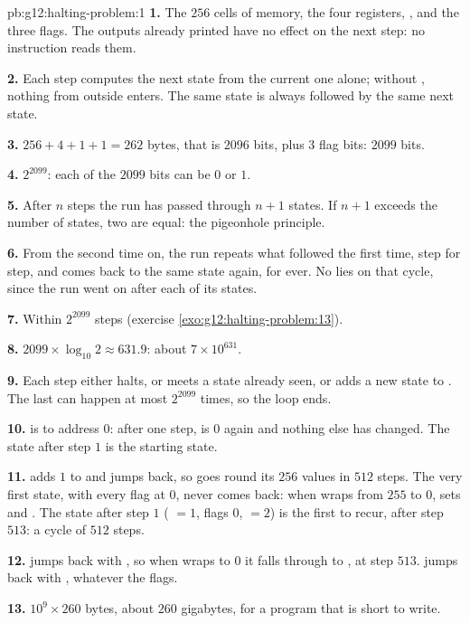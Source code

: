 \begin{solution}{pb:g12:halting-problem:1}
\textbf{1.} The $256$ cells of memory, the four registers, ,  and the three flags. The outputs
already printed have no effect on the next step: no instruction reads them.

\textbf{2.} Each step computes the next state from the current one alone; without , nothing from outside
enters. The same state is always followed by the same next state.

\textbf{3.} $256 + 4 + 1 + 1 = 262$ bytes, that is $2096$ bits, plus $3$ flag bits: $2099$ bits.

\textbf{4.} $2^{2099}$: each of the $2099$ bits can be $0$ or $1$.

\textbf{5.} After $n$ steps the run has passed through $n + 1$ states. If $n + 1$ exceeds the number of states, two
are equal: the pigeonhole principle.

\textbf{6.} From the second time on, the run repeats what followed the first time, step for step, and comes back to
the same state again, for ever. No  lies on that cycle, since the run went on after each of its states.

\textbf{7.} Within $2^{2099}$ steps (exercise \ref{exo:g12:halting-problem:13}).

\textbf{8.} $2099 \times \log_{10} 2 \approx 631.9$: about $7 \times 10^{631}$.

\textbf{9.} Each step either halts, or meets a state already seen, or adds a new state to . The last can
happen at most $2^{2099}$ times, so the loop ends.

\textbf{10.}  is  to address $0$: after one step,  is $0$ again and nothing else has
changed. The state after step $1$ is the starting state.

\textbf{11.}  adds $1$ to  and jumps back, so  goes round its $256$ values in $512$
steps. The very first state, with every flag at $0$, never comes back: when  wraps from $255$ to $0$,
 sets  and . The state after step $1$ ( $= 1$, flags $0$,  $= 2$) is the
first to recur, after step $513$: a cycle of $512$ steps.

\textbf{12.}  jumps back with , so when  wraps to $0$ it falls through to
, at step $513$.  jumps back with , whatever the flags.

\textbf{13.} $10^9 \times 260$ bytes, about $260$ gigabytes, for a program that is short to write.


\end{solution}
